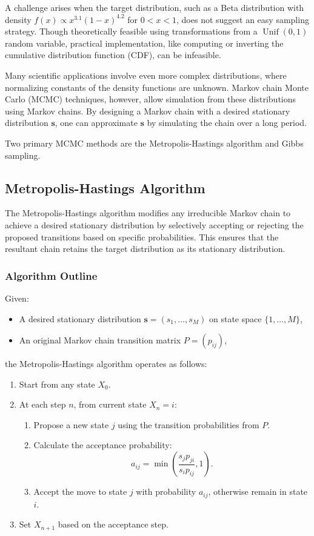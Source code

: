 \documentclass{article}
\begin{document}
A challenge arises when the target distribution, such as a Beta distribution with density $f(x) \propto x^{3.1}(1-x)^{4.2}$ for $0 < x < 1$, does not suggest an easy sampling strategy. Though theoretically feasible using transformations from a $\operatorname{Unif}(0,1)$ random variable, practical implementation, like computing or inverting the cumulative distribution function (CDF), can be infeasible.

Many scientific applications involve even more complex distributions, where normalizing constants of the density functions are unknown. Markov chain Monte Carlo (MCMC) techniques, however, allow simulation from these distributions using Markov chains. By designing a Markov chain with a desired stationary distribution $\mathbf{s}$, one can approximate $\mathbf{s}$ by simulating the chain over a long period.

Two primary MCMC methods are the Metropolis-Hastings algorithm and Gibbs sampling.

\subsection{Metropolis-Hastings Algorithm}
The Metropolis-Hastings algorithm modifies any irreducible Markov chain to achieve a desired stationary distribution by selectively accepting or rejecting the proposed transitions based on specific probabilities. This ensures that the resultant chain retains the target distribution as its stationary distribution.

\subsubsection{Algorithm Outline}
Given:
\begin{itemize}
    \item A desired stationary distribution $\mathbf{s} = (s_1, \ldots, s_M)$ on state space $\{1, \ldots, M\}$,
    \item An original Markov chain transition matrix $P = (p_{ij})$,
\end{itemize}

the Metropolis-Hastings algorithm operates as follows:
\begin{enumerate}
    \item Start from any state $X_0$.
    \item At each step $n$, from current state $X_n = i$:
    \begin{enumerate}
        \item Propose a new state $j$ using the transition probabilities from $P$.
        \item Calculate the acceptance probability:
        \[
        a_{ij} = \min \left(\frac{s_j p_{ji}}{s_i p_{ij}}, 1\right).
        \]
        \item Accept the move to state $j$ with probability $a_{ij}$, otherwise remain in state $i$.
    \end{enumerate}
    \item Set $X_{n+1}$ based on the acceptance step.
\end{enumerate}
\end{document}

